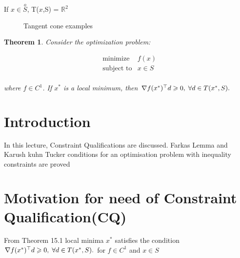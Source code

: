 \documentclass[twoside]{article}
\newcounter{lecnum}
\newtheorem{theorem}{Theorem}[lecnum]
\DeclareMathOperator{\minimize}{minimize}
\DeclareMathOperator{\subjectto}{subject\ to}
\begin{document}
If $x \in \overset{o}{S}$, T($x$,S) = $\mathbb{R}^2$
\begin{figure}[h]
	\centering
    \qquad
    \caption{Tangent cone examples}
    \label{fig:example}
\end{figure}

\begin{theorem}
Consider the optimization problem:

\begin{equation}
\begin{aligned}
& \minimize & f(x)\\
& \subjectto &x \in S\\
\end{aligned}
\end{equation}

where $f \in C^{1}$. If $x^{*}$ is a local minimum, then $\nabla f(x^{*})^{\top}d \geqslant 0, \hspace{1mm}\forall d \in T(x^{*},S).$
\end{theorem}



\section{Introduction}
In this lecture, Constraint Qualifications are discussed. Farkas Lemma and Karush kuhn Tucker conditions for an optimisation problem with inequality constraints are proved  

\section{Motivation for need of Constraint Qualification(CQ)}
From Theorem 15.1 local minima $x^*$ satisfies the condition $\nabla f(x^{*})^{\top}d \geqslant 0, \hspace{1mm}\forall d \in T(x^{*},S).$ for $f \in C^{1}$ and $x \in S$
\end{document}
